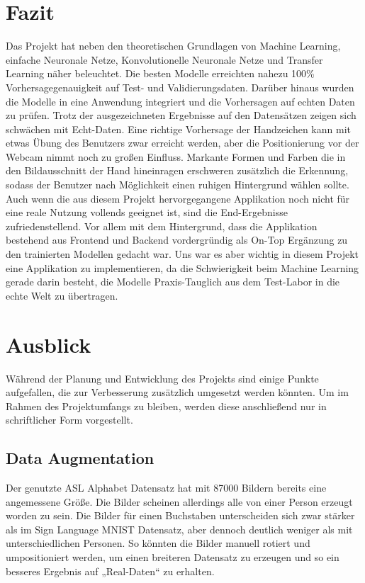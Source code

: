 \documentclass[11pt,bibliography=totocnumbered]{scrartcl}
\begin{document}
\section{Fazit} 
Das Projekt hat neben den theoretischen Grundlagen von Machine Learning, einfache Neuronale Netze, Konvolutionelle Neuronale Netze und Transfer Learning näher beleuchtet. Die besten Modelle erreichten nahezu 100\% Vorhersagegenauigkeit auf Test- und Validierungsdaten. Darüber hinaus wurden die Modelle in eine Anwendung integriert und die Vorhersagen auf echten Daten zu prüfen. Trotz der ausgezeichneten Ergebnisse auf den Datensätzen zeigen sich schwächen mit Echt-Daten. Eine richtige Vorhersage der Handzeichen kann mit etwas Übung des Benutzers zwar erreicht werden, aber die Positionierung vor der Webcam nimmt noch zu großen Einfluss. Markante Formen und Farben die in den Bildausschnitt der Hand hineinragen erschweren zusätzlich die Erkennung, sodass der Benutzer nach Möglichkeit einen ruhigen Hintergrund wählen sollte. Auch wenn die aus diesem Projekt hervorgegangene Applikation noch nicht für eine reale Nutzung vollends geeignet ist, sind die End-Ergebnisse zufriedenstellend. Vor allem mit dem Hintergrund, dass die Applikation bestehend aus Frontend und Backend vordergründig als On-Top Ergänzung zu den trainierten Modellen gedacht war. Uns war es aber wichtig in diesem Projekt eine Applikation zu implementieren, da die Schwierigkeit beim Machine Learning gerade darin besteht, die Modelle Praxis-Tauglich aus dem Test-Labor in die echte Welt zu übertragen.   
\section{Ausblick}
Während der Planung und Entwicklung des Projekts sind einige Punkte aufgefallen, die zur Verbesserung zusätzlich umgesetzt werden könnten. Um im Rahmen des Projektumfangs zu bleiben, werden diese anschließend nur in schriftlicher Form vorgestellt.
\subsection{Data Augmentation}
Der genutzte ASL Alphabet Datensatz hat mit 87000 Bildern bereits eine angemessene Größe. Die Bilder scheinen allerdings alle von einer Person erzeugt worden zu sein. Die Bilder für einen Buchstaben unterscheiden sich zwar stärker als im Sign Language MNIST Datensatz, aber dennoch deutlich weniger als mit unterschiedlichen Personen. So könnten die Bilder manuell rotiert und umpositioniert werden, um einen breiteren Datensatz zu erzeugen und so ein besseres Ergebnis auf „Real-Daten“ zu erhalten.
\end{document}
